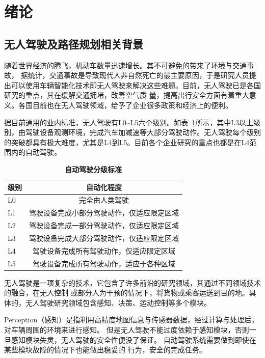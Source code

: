 

\section{绪论}
\subsection{无人驾驶及路径规划相关背景}
随着世界经济的腾飞，机动车数量迅速增长。其不可避免的带来了环境与交通事故，
据统计，交通事故是导致现代人非自然死亡的最主要原因，于是研究人员提出可以使用车辆智能化技术即无人驾驶来解决这些难题。目前，无人驾驶已是各国研究的重点，其在缓解交通拥堵，改善空气质
量，提高出行安全方面有着重大意义。各国目前也在无人驾驶领域，给予了企业很多政策和经济上的便利。

据目前通用的业内标准，无人驾驶有L0\~{}L5六个级别。如表~\ref{tab:tab1}所示，其中L3以上级别，由驾驶设备观测环境，完成汽车加减速等大部分驾驶动作。无人驾驶每个级别的突破都具有极大难度，尤其是L4到L5。目前各个企业研究的重点也都是在L4范围内的自动驾驶。
\begin{table}[H]
  \centering
  \caption{ \textbf{自动驾驶分级标准}}
  \begin{tabular}{lc}
    \toprule
    级别          &       自动化程度                         \\
    \midrule
    L0   & 完全由人类驾驶\\
    L1   & 驾驶设备完成小部分驾驶动作，仅适应限定区域                     \\
    L2 & 驾驶设备完成一部分驾驶动作，仅适应限定区域    \\
    L3 & 驾驶设备完成大部分驾驶动作，仅适应限定区域  \\
    L4 & 驾驶设备完成所有驾驶动作，仅适应限定区域        \\
    L5 & 驾驶设备完成所有驾驶动作，适应于各种区域       \\
    \bottomrule
  \end{tabular}
  \label{tab:tab1}
\end{table}

无人驾驶是一项复杂的技术，它包含了许多前沿的研究领域，其通过不同领域技术的融合，在无人控制
或部分人为干预的情况下，将货物或乘客运送到目的地。具体的，无人驾驶研究领域包含感知、决策、运动控制等多个模块。

Perception（感知）是指利用高精度地图信息与传感器数据，经过计算与处理后，对车辆周围的环境来进行感知。
但是无人驾驶不能过度依赖于感知模块，否则一旦感知模块失灵，无人驾驶的安全性便没了保证。
自动驾驶系统需要做到即使在某些模块故障的情况下也能做出稳妥的
行为，安全的完成任务。

